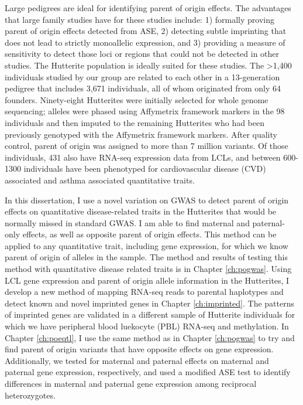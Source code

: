 Large pedigrees are ideal for identifying parent of origin effects\cite{Baran:2015cx}. The advantages that large family studies have for these studies include: 1) formally proving parent of origin effects detected from ASE, 2) detecting subtle imprinting that does not lead to strictly monoallelic expression, and 3) providing a measure of sensitivity to detect those loci or regions that could not be detected in other studies.\cite{Baran:2015cx} The Hutterite population is ideally suited for these studies. The >1,400 individuals studied by our group are related to each other in a 13-generation pedigree that includes 3,671 individuals, all of whom originated from only 64 founders. Ninety-eight Hutterites were initially selected for whole genome sequencing; alleles were phased using Affymetrix framework markers in the 98 individuals and then imputed to the remaining Hutterites who had been previously genotyped with the Affymetrix framework markers\cite{Livne2015}. After quality control, parent of origin was assigned to more than 7 million variants. Of those individuals, 431 also have RNA-seq expression data from LCLs, and between 600-1300 individuals have been phenotyped for cardiovascular disease (CVD) associated  and asthma associated quantitative traits.


In this dissertation, I use a novel variation on GWAS to detect parent of origin effects on quantitative disease-related traits in the Hutterites that would be normally missed in standard GWAS. I am able to find maternal and paternal-only effects, as well as opposite parent of origin effects. This method can be applied to any quantitative trait, including gene expression, for which we know parent of origin of alleles in the sample. The method and results of testing this method with quantitative disease related traits is in Chapter \ref{ch:pogwas}. Using LCL gene expression and parent of origin allele information in the Hutterites, I develop a new method of mapping RNA-seq reads to parental haplotypes and detect known and novel imprinted genes in Chapter \ref{ch:imprinted}. The patterns of imprinted genes are validated in a different sample of Hutterite individuals for which we have peripheral blood luekocyte (PBL) RNA-seq and methylation. In Chapter \ref{ch:poeqtl}, I use the same method as in Chapter \ref{ch:pogwas} to try and find parent of origin variants that have opposite effects on gene expression. Additionally, we tested for maternal and paternal effects on maternal and paternal gene expression, respectively, and used a modified ASE test to identify differences in maternal and paternal gene expression among reciprocal heterozygotes. 

